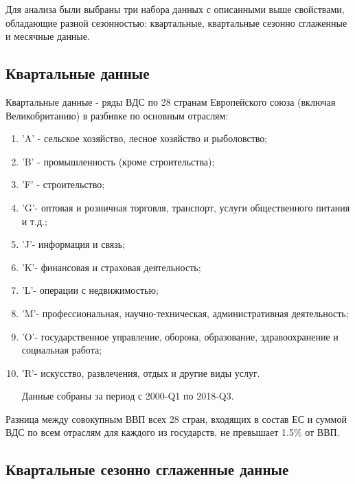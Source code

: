 \documentclass[12pt,a4paper, oneside]{extreport}
\begin{document}
Для анализа были выбраны три набора данных с описанными выше свойствами, обладающие  разной сезонностью:  квартальные, квартальные сезонно сглаженные и месячные данные.  


\subsection{Квартальные данные}

Квартальные данные - ряды ВДС по 28 странам Европейского союза (включая Великобританию) в разбивке по основным отраслям:

\begin{enumerate}
	\item  'A' - сельское хозяйство, лесное хозяйство и рыболовство;
\item  'B' - промышленность (кроме строительства);
\item  'F' - строительство;
\item  'G'- оптовая и розничная торговля, транспорт, услуги общественного питания и т.д.;
\item  'J'- информация и связь;
\item  'K'- финансовая и страховая деятельность;
\item  'L'- операции с недвижимостью;
\item  'M'- профессиональная, научно-техническая, административная деятельность;
\item  'O'- государственное управление, оборона, образование, здравоохранение и социальная работа;
\item  'R'- искусство, развлечения, отдых и другие виды услуг. 

Данные собраны за период с 2000-Q1 по 2018-Q3. 


\end{enumerate}


Разница между совокупным ВВП всех 28 стран, входящих в состав ЕС  и суммой ВДС по всем отраслям для каждого из государств, не превышает  1.5\% от ВВП. 

\subsection{Квартальные сезонно сглаженные данные}
\end{document}
